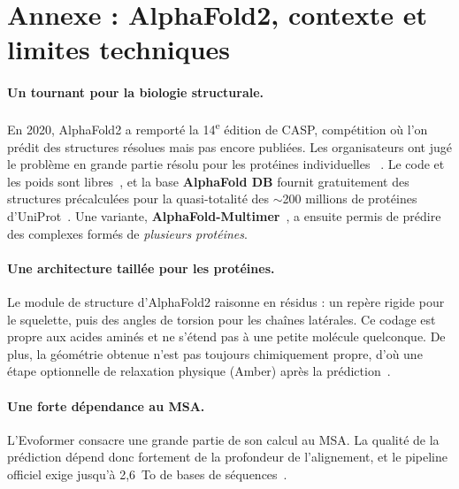 \section{Annexe : AlphaFold2, contexte et limites techniques}
\label{annexe:af2contexte}

\paragraph{Un tournant pour la biologie structurale.} En 2020, AlphaFold2 a remporté la 14\textsuperscript{e} édition de CASP, compétition où l'on prédit des structures résolues mais pas encore publiées. Les organisateurs ont jugé le problème \og en grande partie résolu pour les protéines individuelles \fg{}~\cite{kryshtafovych2021}. Le code et les poids sont libres~\cite{alphafold_github}, et la base \textbf{AlphaFold DB} fournit gratuitement des structures précalculées pour la quasi-totalité des $\sim$200 millions de protéines d'UniProt~\cite{varadi2022}. Une variante, \textbf{AlphaFold-Multimer}~\cite{evans2021}, a ensuite permis de prédire des complexes formés de \emph{plusieurs protéines}.

\paragraph{Une architecture taillée pour les protéines.} Le module de structure d'AlphaFold2 raisonne en \og résidus \fg{} : un repère rigide pour le squelette, puis des angles de torsion pour les chaînes latérales. Ce codage est propre aux acides aminés et ne s'étend pas à une petite molécule quelconque. De plus, la géométrie obtenue n'est pas toujours chimiquement propre, d'où une étape optionnelle de relaxation physique (Amber) après la prédiction~\cite{jumper2021}.

\paragraph{Une forte dépendance au MSA.} L'Evoformer consacre une grande partie de son calcul au MSA. La qualité de la prédiction dépend donc fortement de la profondeur de l'alignement, et le pipeline officiel exige jusqu'à 2,6~To de bases de séquences~\cite{alphafold_github}.
